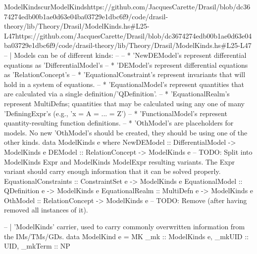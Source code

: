 \begin{haskell}{ModelKinds}{curModelKinds}{https://github.com/JacquesCarette/Drasil/blob/dc3674274edb00b1ae0d63e04ba03729e1dbc6f9/code/drasil-theory/lib/Theory/Drasil/ModelKinds.hs\#L25-L47}{https://github.com/JacquesCarette/Drasil/blob/dc3674274edb00b1ae0d63e04ba03729e1dbc6f9/code/drasil-theory/lib/Theory/Drasil/ModelKinds.hs\#L25-L47}
-- | Models can be of different kinds: 
--
--     * 'NewDEModel's represent differential equations as 'DifferentialModel's
--     * 'DEModel's represent differential equations as 'RelationConcept's
--     * 'EquationalConstraint's represent invariants that will hold in a system of equations.
--     * 'EquationalModel's represent quantities that are calculated via a single definition/'QDefinition'.
--     * 'EquationalRealm's represent MultiDefns; quantities that may be calculated using any one of many 'DefiningExpr's (e.g., 'x = A = ... = Z')
--     * 'FunctionalModel's represent quantity-resulting function definitions.
--     * 'OthModel's are placeholders for models. No new 'OthModel's should be created, they should be using one of the other kinds.
data ModelKinds e where
  NewDEModel            :: DifferentialModel -> ModelKinds e
  DEModel               :: RelationConcept   -> ModelKinds e -- TODO: Split into ModelKinds Expr and ModelKinds ModelExpr resulting variants. The Expr variant should carry enough information that it can be solved properly.
  EquationalConstraints :: ConstraintSet e   -> ModelKinds e
  EquationalModel       :: QDefinition e     -> ModelKinds e
  EquationalRealm       :: MultiDefn e       -> ModelKinds e
  OthModel              :: RelationConcept   -> ModelKinds e -- TODO: Remove (after having removed all instances of it).


-- | 'ModelKinds' carrier, used to carry commonly overwritten information from the IMs/TMs/GDs.
data ModelKind e = MK {
  _mk     :: ModelKinds e,
  _mkUID  :: UID,
  _mkTerm :: NP
}
\end{haskell}
